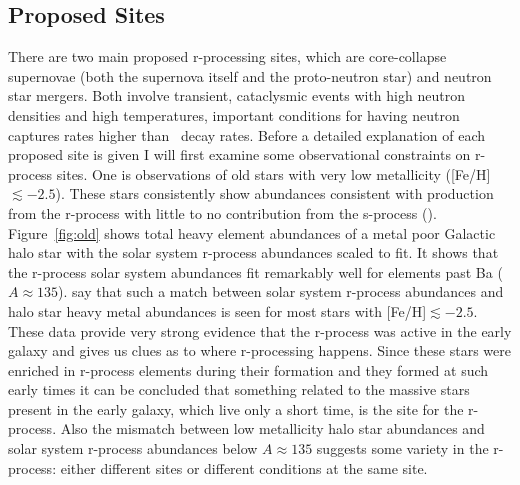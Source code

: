 {%


\subsection{Proposed Sites}

There are two main proposed r-processing sites, which are core-collapse
supernovae (both the supernova itself and the proto-neutron star) and neutron star mergers.  Both involve transient, cataclysmic events
with high neutron densities and high temperatures, important
conditions for having neutron captures rates higher than \bminus\
decay rates.  Before a detailed explanation of each proposed site is
given I will first examine some observational constraints on r-process
sites. One is observations of old stars with very low
metallicity ([Fe/H]$\lesssim-2.5$).  These stars consistently show
abundances consistent with production from the r-process with little
to no contribution from the s-process (\citealt{truranetal2002}).  
Figure~\ref{fig:old} shows 
total heavy element abundances of a metal poor  Galactic halo star with
the solar system r-process abundances scaled to fit.  It shows that the r-process solar system abundances
fit remarkably well for elements past Ba ($A\approx 135$).  \cite{truranetal2002} say
that such a match between solar system r-process abundances and halo
star heavy metal abundances is seen for most stars with
[Fe/H]$\lesssim-2.5$.  These data provide very strong evidence that
the r-process was active in the early galaxy and gives us clues as to
where r-processing happens.  Since these stars were enriched in
r-process elements during their formation and they formed at such
early times it can be concluded that something
related to the 
massive stars present in the early galaxy, which live only a short
time, is the site for the r-process.  Also the mismatch between low
metallicity halo star abundances and solar system r-process abundances
below $A\approx135$ suggests some variety in the r-process: either
different sites or different conditions at the same site. 
}
